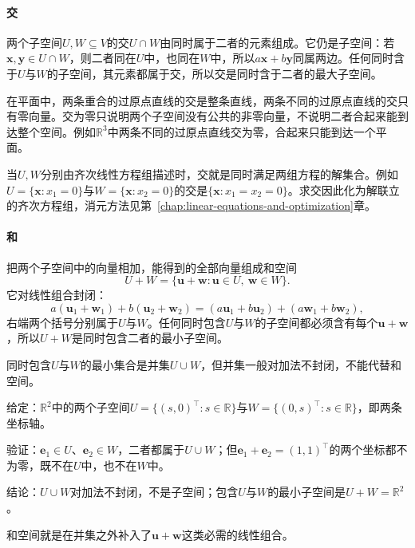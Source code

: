\paragraph{交}
\label{sec:ls-intersection}
两个子空间$U,W\subseteq V$的交$U\cap W$由同时属于二者的元素组成。它仍是子空间：若$\bm x,\bm y\in U\cap W$，则二者同在$U$中，也同在$W$中，所以$a\bm x+b\bm y$同属两边。任何同时含于$U$与$W$的子空间，其元素都属于交，所以交是同时含于二者的最大子空间。

在平面中，两条重合的过原点直线的交是整条直线，两条不同的过原点直线的交只有零向量。交为零只说明两个子空间没有公共的非零向量，不说明二者合起来能到达整个空间。例如$\mathbb R^3$中两条不同的过原点直线交为零，合起来只能到达一个平面。

当$U,W$分别由齐次线性方程组描述时，交就是同时满足两组方程的解集合。例如$U=\{\bm x:x_1=0\}$与$W=\{\bm x:x_2=0\}$的交是$\{\bm x:x_1=x_2=0\}$。求交因此化为解联立的齐次方程组，消元方法见第~\ref{chap:linear-equations-and-optimization}章。

\paragraph{和}
\label{sec:ls-sum}
把两个子空间中的向量相加，能得到的全部向量组成和空间
\[
 U+W=\{\bm u+\bm w:\bm u\in U,\ \bm w\in W\}.
\]
它对线性组合封闭：
\[
 a(\bm u_1+\bm w_1)+b(\bm u_2+\bm w_2)=(a\bm u_1+b\bm u_2)+(a\bm w_1+b\bm w_2),
\]
右端两个括号分别属于$U$与$W$。任何同时包含$U$与$W$的子空间都必须含有每个$\bm u+\bm w$，所以$U+W$是同时包含二者的最小子空间。

同时包含$U$与$W$的最小集合是并集$U\cup W$，但并集一般对加法不封闭，不能代替和空间。
\begin{example}[反例：两条坐标轴的并]
\label{ex:ls-union-not-subspace}
给定：$\mathbb R^2$中的两个子空间$U=\{(s,0)^\top:s\in\mathbb R\}$与$W=\{(0,s)^\top:s\in\mathbb R\}$，即两条坐标轴。

验证：$\bm e_1\in U$、$\bm e_2\in W$，二者都属于$U\cup W$；但$\bm e_1+\bm e_2=(1,1)^\top$的两个坐标都不为零，既不在$U$中，也不在$W$中。

结论：$U\cup W$对加法不封闭，不是子空间；包含$U$与$W$的最小子空间是$U+W=\mathbb R^2$。
\end{example}
和空间就是在并集之外补入了$\bm u+\bm w$这类必需的线性组合。

